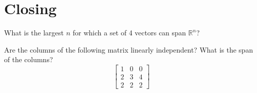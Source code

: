 \documentclass[11pt]{exam}
\begin{document}
    \pagebreak
    \section{Closing}
    \begin{questions}
        \item What is the largest $n$ for which a set of 4 vectors can span $\mathbb{R}^n$?
        \item Are the columns of the following matrix linearly independent? What is the span of the columns?
        $$\begin{bmatrix} 1 & 0 & 0 \\ 2 & 3 & 4 \\ 2 & 2 & 2 \end{bmatrix}$$
    \end{questions}
\end{document}
